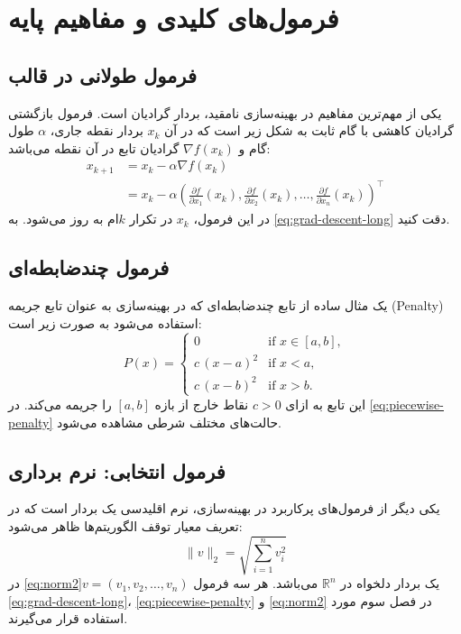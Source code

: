 \chapter{فرمول‌های کلیدی و مفاهیم پایه}
\section{فرمول طولانی در قالب }
یکی از مهم‌ترین مفاهیم در بهینه‌سازی نامقید، بردار گرادیان است. فرمول بازگشتی گرادیان کاهشی با گام ثابت به شکل زیر است که در آن \( x_k \) بردار نقطه جاری، \( \alpha \) طول گام و \( \nabla f(x_k) \) گرادیان تابع در آن نقطه می‌باشد:
\begin{align}
	x_{k+1} &= x_k - \alpha \nabla f(x_k) \nonumber \\
	&= x_k - \alpha \left( \frac{\partial f}{\partial x_1}(x_k), 
	\frac{\partial f}{\partial x_2}(x_k), \dots, 
	\frac{\partial f}{\partial x_n}(x_k) \right)^\top
	\label{eq:grad-descent-long}
\end{align}
در این فرمول، \( x_k \) در تکرار \( k \)ام به روز می‌شود. به \cref{eq:grad-descent-long} دقت کنید.

\section{فرمول چندضابطه‌ای}
یک مثال ساده از تابع چندضابطه‌ای که در بهینه‌سازی به عنوان تابع جریمه (Penalty) استفاده می‌شود به صورت زیر است:
\begin{equation}
	P(x) =
	\begin{cases}
		0 & \text{if } x \in [a,b], \\
		c\,(x-a)^2 & \text{if } x < a, \\
		c\,(x-b)^2 & \text{if } x > b.
	\end{cases}
	\label{eq:piecewise-penalty}
\end{equation}
این تابع به ازای \( c > 0 \) نقاط خارج از بازه \([a,b]\) را جریمه می‌کند. در \cref{eq:piecewise-penalty} حالت‌های مختلف شرطی مشاهده می‌شود.

\section{فرمول انتخابی: نرم برداری}
یکی دیگر از فرمول‌های پرکاربرد در بهینه‌سازی، نرم اقلیدسی یک بردار است که در تعریف معیار توقف الگوریتم‌ها ظاهر می‌شود:
\begin{equation}
	\|v\|_2 = \sqrt{\sum_{i=1}^{n} v_i^2}
	\label{eq:norm2}
\end{equation}
در \cref{eq:norm2}\( v = (v_1, v_2, \dots, v_n) \) یک بردار دلخواه در \( \mathbb{R}^n \) می‌باشد. هر سه فرمول \cref{eq:grad-descent-long}، \cref{eq:piecewise-penalty} و \cref{eq:norm2} در فصل سوم مورد استفاده قرار می‌گیرند.